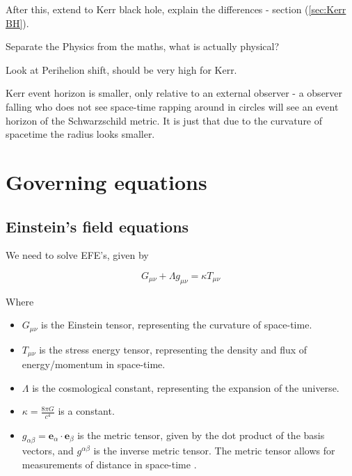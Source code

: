 After this, extend to Kerr black hole, explain the differences - section (\ref{sec:Kerr BH}).

Separate the Physics from the maths, what is actually physical?

Look at Perihelion shift, should be very high for Kerr. 

Kerr event horizon is smaller, only relative to an external observer - a observer falling who does not see space-time rapping around in circles will see an event horizon of the Schwarzschild metric. It is just that due to the curvature of spacetime the radius looks smaller.


\section{Governing equations}

\subsection{Einstein's field equations}

We need to solve EFE's, given by 

\begin{equation}
    G_{\mu \nu} + \Lambda g_{\mu \nu} = \kappa T_{\mu \nu}
\label{eq:EFE}
\end{equation}

Where 

\begin{itemize}
    \item $G_{\mu \nu}$ is the Einstein tensor, representing the curvature of space-time.
    
    \item $T_{\mu \nu}$ is the stress energy tensor, representing the density and flux of energy/momentum in space-time.
    
    \item $\Lambda$ is the cosmological constant, representing the expansion of the universe.
    
    \item $\kappa=\frac{8\pi G}{c^4}$ is a constant.
    
    \item $g_{\alpha \beta} = \boldsymbol{e}_\alpha \cdot \boldsymbol{e}_\beta$ is the metric tensor, given by the dot product of the basis vectors, and $g^{\alpha \beta}$ is the inverse metric tensor. The metric tensor allows for measurements of distance in space-time
    .
\end{itemize}

